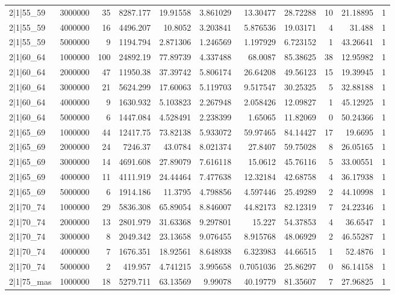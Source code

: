 \begin{tabular}{lrrrrrrrrrr}
2|1|55\_59 & 3000000 & 35 & 8287.177 & 19.91558 & 3.861029 & 13.30477 & 28.72288 & 10 & 21.18895 & 1 \\
2|1|55\_59 & 4000000 & 16 & 4496.207 & 10.8052 & 3.203841 & 5.876536 & 19.03171 & 4 & 31.488 & 1 \\
2|1|55\_59 & 5000000 & 9 & 1194.794 & 2.871306 & 1.246569 & 1.197929 & 6.723152 & 1 & 43.26641 & 1 \\
2|1|60\_64 & 1000000 & 100 & 24892.19 & 77.89739 & 4.337488 & 68.0087 & 85.38625 & 38 & 12.95982 & 1 \\
2|1|60\_64 & 2000000 & 47 & 11950.38 & 37.39742 & 5.806174 & 26.64208 & 49.56123 & 15 & 19.39945 & 1 \\
2|1|60\_64 & 3000000 & 21 & 5624.299 & 17.60063 & 5.119703 & 9.517547 & 30.25325 & 5 & 32.88188 & 1 \\
2|1|60\_64 & 4000000 & 9 & 1630.932 & 5.103823 & 2.267948 & 2.058426 & 12.09827 & 1 & 45.12925 & 1 \\
2|1|60\_64 & 5000000 & 6 & 1447.084 & 4.528491 & 2.238399 & 1.65065 & 11.82069 & 0 & 50.24366 & 1 \\
2|1|65\_69 & 1000000 & 44 & 12417.75 & 73.82138 & 5.933072 & 59.97465 & 84.14427 & 17 & 19.6695 & 1 \\
2|1|65\_69 & 2000000 & 24 & 7246.37 & 43.0784 & 8.021374 & 27.8407 & 59.75028 & 8 & 26.05165 & 1 \\
2|1|65\_69 & 3000000 & 14 & 4691.608 & 27.89079 & 7.616118 & 15.0612 & 45.76116 & 5 & 33.00551 & 1 \\
2|1|65\_69 & 4000000 & 11 & 4111.919 & 24.44464 & 7.477638 & 12.32184 & 42.68758 & 4 & 36.17938 & 1 \\
2|1|65\_69 & 5000000 & 6 & 1914.186 & 11.3795 & 4.798856 & 4.597446 & 25.49289 & 2 & 44.10998 & 1 \\
2|1|70\_74 & 1000000 & 29 & 5836.308 & 65.89054 & 8.846007 & 44.82173 & 82.12319 & 7 & 24.22346 & 1 \\
2|1|70\_74 & 2000000 & 13 & 2801.979 & 31.63368 & 9.297801 & 15.227 & 54.37853 & 4 & 36.6547 & 1 \\
2|1|70\_74 & 3000000 & 8 & 2049.342 & 23.13658 & 9.076455 & 8.915768 & 48.06929 & 2 & 46.55287 & 1 \\
2|1|70\_74 & 4000000 & 7 & 1676.351 & 18.92561 & 8.648938 & 6.323983 & 44.66515 & 1 & 52.4876 & 1 \\
2|1|70\_74 & 5000000 & 2 & 419.957 & 4.741215 & 3.995658 & 0.7051036 & 25.86297 & 0 & 86.14158 & 1 \\
2|1|75\_mas & 1000000 & 18 & 5279.711 & 63.13569 & 9.99078 & 40.19779 & 81.35607 & 7 & 27.96825 & 1 \\

\end{tabular}
